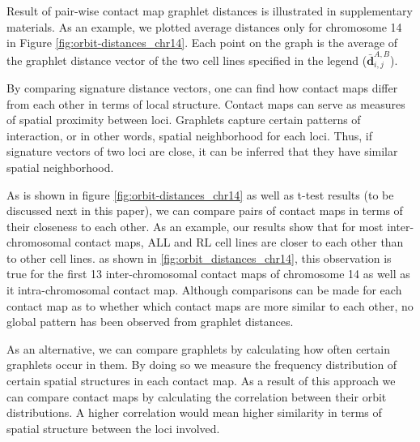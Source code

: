 \documentclass[a4,center,fleqn]{NAR}
\begin{document}
Result of pair-wise contact map graphlet distances is
illustrated in supplementary materials. 
As an example, we plotted average
distances only for chromosome 
14 in Figure \ref{fig:orbit-distances_chr14}.
Each point on the graph is the
average of the graphlet distance vector 
of the two cell lines specified in the legend
($\bar{\mathbf{d}}^{\scriptscriptstyle A,B}_{i,j}$).

By comparing signature distance vectors, one can find
how contact maps
differ from each other in terms of local structure. 
Contact maps can serve as measures of spatial proximity between
loci. Graphlets capture certain patterns of interaction, or
in other words, spatial neighborhood for each loci. Thus, if
signature vectors of two loci are close,
 it can be inferred that they have 
similar spatial neighborhood.

As is shown in
figure \ref{fig:orbit-distances_chr14} as well as t-test results
(to be discussed next in this paper),
we can compare pairs of contact maps in terms of their closeness
to each other. 
As an example, our results show that
for most inter-chromosomal contact maps, ALL
and RL cell lines are closer to each other than to other
cell lines. as  shown in 
\ref{fig:orbit_distances_chr14}, this observation is
true for the first 13 inter-chromosomal 
contact maps of chromosome 14 as well as it intra-chromosomal
contact map.
Although comparisons can be made for each contact map as to
whether which contact maps are more similar to each other,
no global pattern has been observed from graphlet distances.

As an alternative, we can compare graphlets by calculating
how often certain graphlets occur in them. By doing so
we measure the frequency distribution
of certain spatial structures in
each contact map. As a result of this approach
we can compare contact maps by calculating the 
correlation between their orbit distributions.
A higher correlation would mean higher similarity
in terms of spatial structure between the loci
involved.
\end{document}
